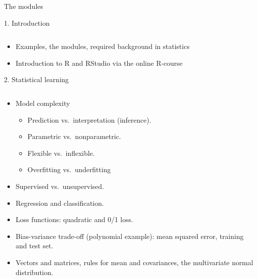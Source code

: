 \documentclass[10pt,ignorenonframetext,]{beamer}
\providecommand{\tightlist}{%
  \setlength{\itemsep}{0pt}\setlength{\parskip}{0pt}}
\begin{document}
\begin{frame}{The modules}
\protect\hypertarget{the-modules}{}

\begin{block}{1. Introduction}

\(~\)

\begin{itemize}
\tightlist
\item
  Examples, the modules, required background in statistics \vspace{2mm}
\item
  Introduction to R and RStudio via the online R-course
\end{itemize}

\end{block}

\end{frame}

\begin{frame}

\begin{block}{2. Statistical learning}

\(~\)

\begin{itemize}
\tightlist
\item
  Model complexity

  \begin{itemize}
  \tightlist
  \item
    Prediction vs.~interpretation (inference).\\
  \item
    Parametric vs.~nonparametric.
  \item
    Flexible vs.~inflexible.
  \item
    Overfitting vs.~underfitting \vspace{2mm}
  \end{itemize}
\item
  Supervised vs.~unsupervised. \vspace{2mm}
\item
  Regression and classification. \vspace{2mm}
\item
  Loss functions: quadratic and 0/1 loss. \vspace{2mm}
\item
  Bias-variance trade-off (polynomial example): mean squared error,
  training and test set. \vspace{2mm}
\item
  Vectors and matrices, rules for mean and covariances, the multivariate
  normal distribution.
\end{itemize}

\end{block}

\end{frame}
\end{document}
